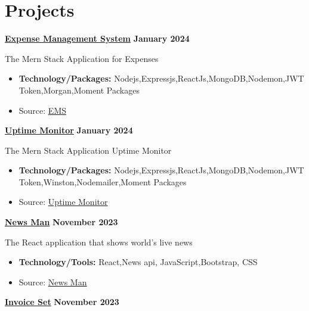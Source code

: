 \documentclass[letterpaper, 11pt]{article}
\newcommand{\bulletSpace}{\vspace{-8pt}}
\newcommand{\secStartSpace}{\vspace{3pt}}
\newcommand{\spaceCollapse}{\vspace{-5pt}}
\begin{document}



\section{\color{blue} \textbf{Projects}}
\secStartSpace

\begin{addmargin}[1em]{1em}
\noindent\href{https://github.com/sukhlotey/Expense-Management-System}{\textbf{Expense Management System}}  \hfill \textbf{January 2024} 
		
	\noindent The Mern Stack Application for Expenses
	\spaceCollapse
	\begin{itemize}
		\item \textbf{Technology/Packages:} Nodejs,Expressjs,ReactJs,MongoDB,Nodemon,JWT Token,Morgan,Moment Packages
		      \bulletSpace
		\item Source:  \href{https://github.com/sukhlotey/Expense-Management-System}{\underline{EMS}}
	\end{itemize}
		
 \noindent\href{https://github.com/sukhlotey/Uptime-monitor}{\textbf{Uptime Monitor}}  \hfill \textbf{January 2024} 
		
	\noindent The Mern Stack Application Uptime Monitor
	\spaceCollapse
	\begin{itemize}
		\item \textbf{Technology/Packages:} Nodejs,Expressjs,ReactJs,MongoDB,Nodemon,JWT Token,Winston,Nodemailer,Moment Packages
		      \bulletSpace
		\item Source:  \href{https://github.com/sukhlotey/Uptime-monitor}{\underline{Uptime Monitor}}
	\end{itemize}
	\noindent\href{https://github.com/sukhlotey/newsdaily}{\textbf{News Man}}  \hfill \textbf{November 2023} 
		
	\noindent The React application that shows world's live news
	\spaceCollapse
	\begin{itemize}
		\item \textbf{Technology/Tools:} React,News api, JavaScript,Bootstrap, CSS
		      \bulletSpace
        
		\item Source:  \href{https://github.com/sukhlotey/newsdaily}{\underline{News Man}}
	\end{itemize}
 \noindent\href{https://github.com/sukhlotey/invoice-set}{\textbf{Invoice Set}}  \hfill \textbf{November 2023} 
		

\end{addmargin}
\end{document}
